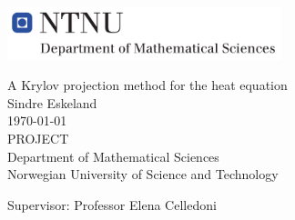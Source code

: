 
\thispagestyle{empty}
\includegraphics[height=0.6in]{fig/rams}
\mbox{}\\[6pc]
\begin{center}
\Huge{A Krylov projection method for the heat equation }\\[2pc]

\Large{Sindre Eskeland}\\[1pc]
\large{\today}\\[2pc]

PROJECT\\
Department of Mathematical Sciences\\
Norwegian University of Science and Technology
\end{center}
\vfill

\noindent Supervisor: Professor Elena Celledoni


